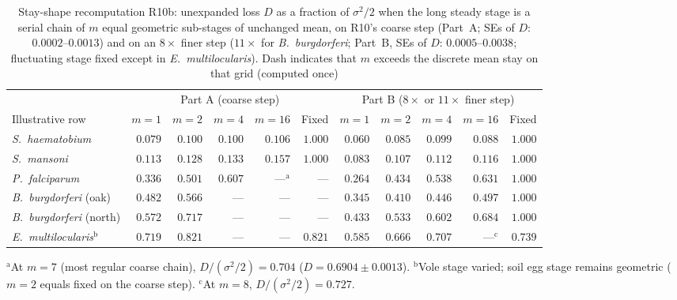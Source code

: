 \begin{table}[htbp]\centering\scriptsize
\setlength{\tabcolsep}{3pt}
\caption{Stay-shape recomputation R10b: unexpanded loss $D$ as a fraction of $\sigma^2/2$ when the long steady stage is a serial chain of $m$ equal geometric sub-stages of unchanged mean, on R10's coarse step (Part~A; SEs of $D$: $0.0002$--$0.0013$) and on an $8\times$ finer step ($11\times$ for \emph{B.~burgdorferi}; Part~B, SEs of $D$: $0.0005$--$0.0038$; fluctuating stage fixed except in \emph{E.~multilocularis}). Dash indicates that $m$ exceeds the discrete mean stay on that grid (computed once)}\label{num-esm-tab-r10b-a}
\begin{tabular}{lrrrrr|rrrrr}\toprule
 & \multicolumn{5}{c|}{Part A (coarse step)} & \multicolumn{5}{c}{Part B ($8\times$ or $11\times$ finer step)}\\
Illustrative row & $m=1$ & $m=2$ & $m=4$ & $m=16$ & Fixed & $m=1$ & $m=2$ & $m=4$ & $m=16$ & Fixed\\\midrule
\emph{S.~haematobium} & $0.079$ & $0.100$ & $0.100$ & $0.106$ & $1.000$ & $0.060$ & $0.085$ & $0.099$ & $0.088$ & $1.000$\\
\emph{S.~mansoni} & $0.113$ & $0.128$ & $0.133$ & $0.157$ & $1.000$ & $0.083$ & $0.107$ & $0.112$ & $0.116$ & $1.000$\\
\emph{P.~falciparum} & $0.336$ & $0.501$ & $0.607$ & ---$^{\mathrm{a}}$ & --- & $0.264$ & $0.434$ & $0.538$ & $0.631$ & $1.000$\\
\emph{B.~burgdorferi} (oak) & $0.482$ & $0.566$ & --- & --- & --- & $0.345$ & $0.410$ & $0.446$ & $0.497$ & $1.000$\\
\emph{B.~burgdorferi} (north) & $0.572$ & $0.717$ & --- & --- & --- & $0.433$ & $0.533$ & $0.602$ & $0.684$ & $1.000$\\
\emph{E.~multilocularis}$^{\mathrm{b}}$ & $0.719$ & $0.821$ & --- & --- & $0.821$ & $0.585$ & $0.666$ & $0.707$ & ---$^{\mathrm{c}}$ & $0.739$\\\bottomrule
\end{tabular}
\par\smallskip\raggedright\footnotesize
$^{\mathrm{a}}$At $m = 7$ (most regular coarse chain), $D/(\sigma^2/2) = 0.704$ ($D = 0.6904 \pm 0.0013$). $^{\mathrm{b}}$Vole stage varied; soil egg stage remains geometric ($m = 2$ equals fixed on the coarse step). $^{\mathrm{c}}$At $m = 8$, $D/(\sigma^2/2) = 0.727$.
\end{table}

